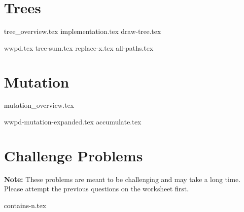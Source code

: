 \documentclass{exam}
\begin{document}
\section{Trees}
{tree_overview.tex}
{implementation.tex}
{draw-tree.tex}
\vspace{.5cm}
\begin{questions}
{wwpd.tex}
\newpage
{tree-sum.tex}
\newpage
{replace-x.tex}
{all-paths.tex}
\end{questions}

\newpage
\section{Mutation}
{mutation_overview.tex}
\begin{questions}
{wwpd-mutation-expanded.tex}
{accumulate.tex}
\end{questions}


\newpage
\section{Challenge Problems}
\textbf{Note:} These problems are meant to be challenging and may take a long time. Please attempt the previous questions on the worksheet first.
\begin{questions}
{contains-n.tex}
\end{questions}
\end{document}
